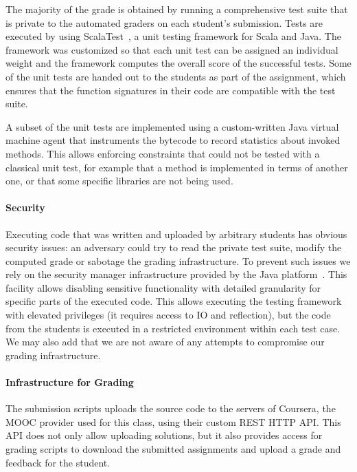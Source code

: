 \documentclass{sig-alternate}
\begin{document}
The majority of the grade is obtained by running a comprehensive test suite
that is private to the automated graders on each student's submission.
Tests are executed by using ScalaTest~\cite{scalatest}, a unit testing framework
for Scala and Java. The framework was customized so that each unit test can be
assigned an individual weight and the framework computes the overall score of
the successful tests. Some of the unit tests are handed out to the students as
part of the assignment, which ensures that the function signatures in their code
are compatible with the test suite.

A subset of the unit tests are implemented using a custom-written Java virtual
machine agent \cite{vmagents} that instruments the bytecode to record statistics about
invoked methods. This allows enforcing constraints that could not be tested with a
classical unit test, for example that a method is implemented in terms of another
one, or that some specific libraries are not being used.

\paragraph{Security}

Executing code that was written and uploaded by arbitrary students has obvious
security issues: an adversary could try to read the private test suite, modify
the computed grade or sabotage the grading infrastructure. To prevent such issues
we rely on the security manager infrastructure provided by the Java platform~\cite{securityManager}.
This facility allows disabling sensitive functionality with detailed granularity
for specific parts of the executed code. This allows executing the testing framework
with elevated privileges (it requires access to IO and reflection), but the code
from the students is executed in a restricted environment within each test case.
We may also add that we are not aware of any attempts to compromise our grading
infrastructure.

\paragraph{Infrastructure for Grading}

The submission scripts uploads the source code to the servers of Coursera, the
MOOC provider used for this class, using their custom REST HTTP API. This API
does not only allow uploading solutions, but it also provides access for grading
scripts to download the submitted assignments and upload a grade and feedback
for the student.
\end{document}
